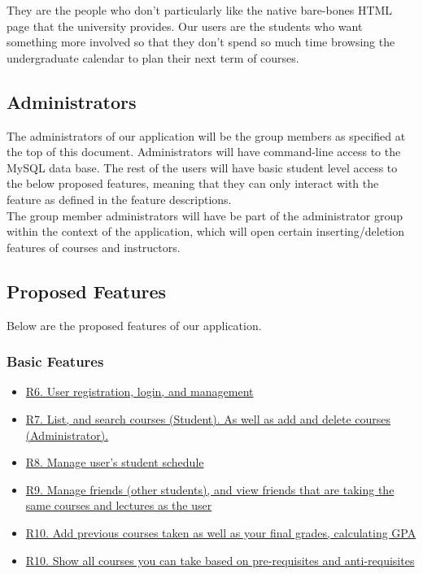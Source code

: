 \documentclass[12pt, a4paper]{article}
\begin{document}
They are the people who don't particularly like the native bare-bones HTML page that the university provides. Our users are the students who want something more involved so that they don't spend so much time browsing the undergraduate calendar to plan their next term of courses.

\subsection*{Administrators}
The administrators of our application will be the group members as specified at the top of this document. Administrators will have command-line access to the MySQL data base. The rest of the users will have basic student level access to the below proposed features, meaning that they can only interact with the feature as defined in the feature descriptions.\\

The group member administrators will have be part of the administrator group within the context of the application, which will open certain inserting/deletion features of courses and instructors.

\subsection*{Proposed Features}
Below are the proposed features of our application.
\subsubsection*{Basic Features}
\begin{itemize}
    \item \hyperref[sec:R6]{R6. User registration, login, and management}
    \item \hyperref[sec:R7]{R7. List, and search courses (Student). As well as add and delete courses (Administrator).}
    \item \hyperref[sec:R8]{R8. Manage user's student schedule}
    \item \hyperref[sec:R9]{R9. Manage friends (other students), and view friends that are taking the same courses and lectures as the user}
    \item \hyperref[sec:R10]{R10. Add previous courses taken as well as your final grades, calculating GPA}
    \item \hyperref[sec:R10]{R10. Show all courses you can take based on pre-requisites and anti-requisites}
\end{itemize}
\end{document}
